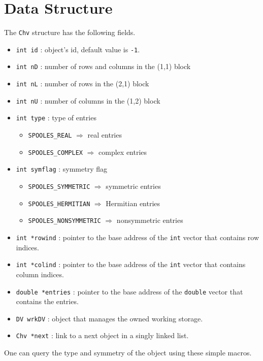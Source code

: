 \par
\section{Data Structure}
\label{section:Chv:dataStructure}
\par
\par
The {\tt Chv} structure has the following fields.
\begin{itemize}
\item
{\tt int id} : object's id, default value is {\tt -1}.
\item
{\tt int nD} : number of rows and columns in the (1,1) block
\item
{\tt int nL} : number of rows in the (2,1) block
\item
{\tt int nU} : number of columns in the (1,2) block
\item
{\tt int type} : type of entries
\begin{itemize}
\item {\tt SPOOLES\_REAL} $\Longrightarrow$ real entries
\item {\tt SPOOLES\_COMPLEX} $\Longrightarrow$ complex entries
\end{itemize}
\item
{\tt int symflag} : symmetry flag
\begin{itemize}
\item {\tt SPOOLES\_SYMMETRIC} $\Longrightarrow$ 
      symmetric entries
\item {\tt SPOOLES\_HERMITIAN} $\Longrightarrow$ 
      Hermitian entries
\item {\tt SPOOLES\_NONSYMMETRIC} $\Longrightarrow$ 
      nonsymmetric entries
\end{itemize}
\item
{\tt int *rowind} : 
pointer to the base address of the {\tt int} vector 
that contains row indices.
\item
{\tt int *colind} : 
pointer to the base address of the {\tt int} vector 
that contains column indices.
\item
{\tt double *entries} : 
pointer to the base address of the {\tt double} vector that
contains the entries.
\item
{\tt DV wrkDV} : 
object that manages the owned working storage.
\item
{\tt Chv *next} : 
link to a next object in a singly linked list.
\end{itemize}
\par
One can query the type and symmetry
of the object using these simple macros.
